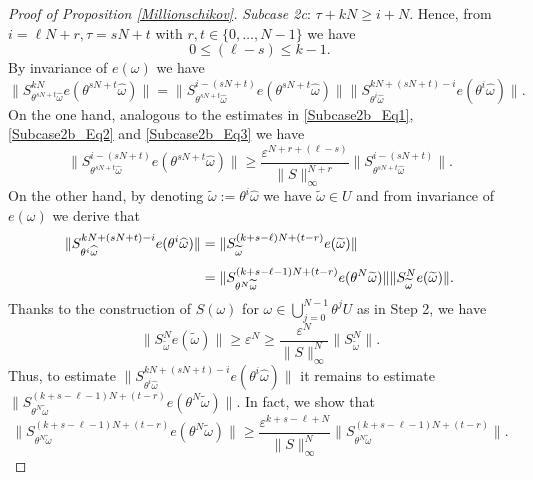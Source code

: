 \documentclass[10pt,a4paper]{amsart}
\newcommand{\eps}{\varepsilon}
\begin{document}
\begin{proof}[Proof of Proposition \ref{Millionschikov}]
\emph{Subcase 2c}: $ \tau+kN\geq i+N$.  Hence, from $i=\ell N+r, \tau=sN+t$ with $r,t\in \{0,\dots,N-1\}$ we have 
\begin{equation}\label{estimateindex_casec}
0\leq (\ell-s)\leq k-1.    
\end{equation}
By invariance of $e(\omega)$ we have 
\begin{equation}\label{Twoparts}
\|S^{kN}_{\theta^{sN+t}\widehat\omega}e(\theta^{sN+t}\widehat\omega)\|=  \|S^{i-(sN+t)}_{\theta^{sN+t}\widehat\omega}e(\theta^{sN+t}\widehat\omega)\|  \|S^{kN+(sN+t)-i}_{\theta^{i}\widehat\omega}e(\theta^{i}\widehat\omega)\|.
\end{equation}
On the one hand, analogous to the estimates in \eqref{Subcase2b_Eq1}, \eqref{Subcase2b_Eq2} and \eqref{Subcase2b_Eq3} we have 
\begin{equation}\label{Estimate_Part1}
  \|S^{i-(sN+t)}_{\theta^{sN+t}\widehat\omega}e(\theta^{sN+t}\widehat\omega)\| 
  \geq \frac{\eps^{N+r+(\ell-s)}}{\|S\|_{\infty}^{N+r}}\|S^{i-(sN+t)}_{\theta^{sN+t}\widehat\omega}\|.
\end{equation}
On the other hand,  by denoting $\widetilde\omega:=\theta^i\widehat\omega$ we have $\widetilde \omega\in U$ and from  invariance of $e(\omega)$ we derive that 
\begin{align}
\|S^{kN+(sN+t)-i}_{\theta^{i}\widehat\omega}e(\theta^{i}\widehat\omega)\|
&=\|S_{\widetilde\omega}^{(k+s-\ell)N+(t-r)}e(\widetilde\omega)\|\notag\\[1ex]
&=
\|S_{\theta^N\widetilde\omega}^{(k+s-\ell-1)N+(t-r)}e(\theta^N\widetilde\omega)\|
\|S_{\widetilde\omega}^{N}e(\widetilde\omega)\|.\label{New_Estimate1}
\end{align}
Thanks to the construction of $S(\omega)$ for $\omega\in\bigcup_{j=0}^{N-1}\theta^j U$ as in Step 2, we have \begin{equation}\label{New_Estimate2}
 \|S_{\widetilde\omega}^{N}e(\widetilde\omega)\|
 \geq 
 \eps^N\geq \frac{\eps^N}{\|S\|_{\infty}^N}\|S^N_{\widetilde\omega}\|.
\end{equation}
Thus, to estimate $\|S^{kN+(sN+t)-i}_{\theta^{i}\widehat\omega}e(\theta^{i}\widehat\omega)\|$ it remains to estimate $\|S_{\theta^N\widetilde\omega}^{(k+s-\ell-1)N+(t-r)}e(\theta^N\widetilde\omega)\|$. In fact, we show that 
\begin{equation}\label{Smallaim}
  \|S_{\theta^N\widetilde\omega}^{(k+s-\ell-1)N+(t-r)}e(\theta^N\widetilde\omega)\| 
  \geq \frac{\eps^{k+s-\ell+N}}{\|S\|_{\infty}^N}       \|S_{\theta^N\widetilde\omega}^{(k+s-\ell-1)N+(t-r)}\|.
\end{equation}

\end{proof}
\end{document}
